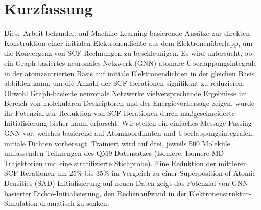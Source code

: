 \chapter*{Kurzfassung}

Diese Arbeit behandelt auf Machine Learning basierende Ansätze zur direkten Konstruktion einer initialen Elektronendichte aus dem Elektronenüberlapp, um die Konvergenz von SCF Rechnungen zu beschleunigen. Es wird untersucht, ob ein Graph-basiertes neuronales Netzwerk (GNN) atomare Überlappungsintegrale in der atomzentrierten Basis auf initiale Elektronendichten in der gleichen Basis abbilden kann, um die Anzahl der SCF Iterationen signifikant zu reduzieren. Obwohl Graph-basierte neuronale Netzwerke vielversprechende Ergebnisse im Bereich von molekularen Deskriptoren und der Energievorhersage zeigen, wurde ihr Potenzial zur Reduktion von SCF Iterationen durch maßgeschneiderte Initialisierung bisher kaum erforscht. Wir stellen ein einfaches Message-Passing GNN vor, welches basierend auf Atomkoordinaten und Überlappungsintegralen, initiale Dichten vorhersagt. Trainiert wird auf drei, jeweils 500 Moleküle umfassenden Teilmengen des QM9 Datensatzes (Isomere, Isomere MD-Trajektorien und eine stratifizierte Stichprobe). Eine Reduktion der mittleren SCF Iterationen um 25\% bis 35\% im Vergleich zu einer Superposition of Atomic Densities (SAD) Initialisierung auf neuen Daten zeigt das Potenzial von GNN basierter Dichte-Initialisierung, den Rechenaufwand in der Elektronenstruktur-Simulation dramatisch zu senken.